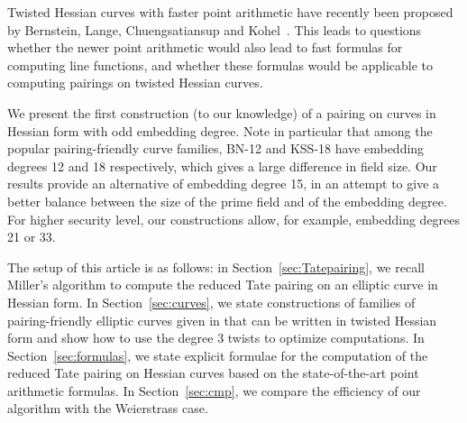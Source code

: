 Twisted Hessian curves with faster point arithmetic have recently been proposed by
Bernstein, Lange, Chuengsatiansup and Kohel~\cite{2015/hessian}.
This leads to questions whether the newer point arithmetic would also lead to fast formulas for computing line functions,
and whether these formulas would be applicable to computing pairings on twisted Hessian curves.

We present the first construction (to our knowledge) of a pairing on curves in Hessian form with odd embedding degree. Note in particular that among the popular pairing-friendly curve families,
BN-12 and KSS-18 have embedding degrees 12 and 18 respectively, which gives a large difference in field size. Our results provide an alternative of embedding degree 15, in an attempt to give a better balance between the size of the prime field and of the embedding degree. For higher security level, our constructions allow, for example, embedding degrees 21 or 33.

The setup of this article is as follows:
in Section~\ref{sec:Tatepairing}, we recall Miller's algorithm to compute the reduced Tate pairing on an elliptic curve in Hessian form.
In Section~\ref{sec:curves}, we state constructions of families of pairing-friendly elliptic curves given in \cite{2010/freeman} that can be written in twisted Hessian form and show how to use the degree 3 twists to optimize computations.
In Section~\ref{sec:formulas}, we state explicit formulae for the computation of the reduced Tate pairing on Hessian curves based on the state-of-the-art point arithmetic formulas.
In Section~\ref{sec:cmp}, we compare the efficiency of our algorithm with the Weierstrass case.


